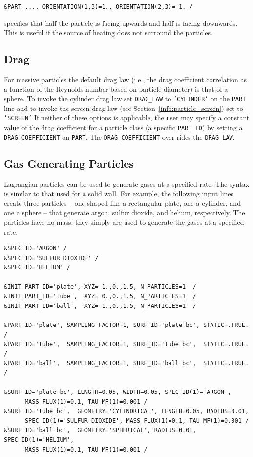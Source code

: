 \documentclass[11pt]{book}
\newcommand{\ct}{\tt\small}
\begin{document}
\footnotesize
\begin{verbatim}
&PART ..., ORIENTATION(1,3)=1., ORIENTATION(2,3)=-1. /
\end{verbatim}
\normalsize

\noindent
specifies that half the particle is facing upwards and half is facing downwards. This is useful if the source of heating does not surround the particles.


\subsection{Drag}
\label{info:particle_drag}

For massive particles the default drag law (i.e., the drag coefficient correlation as a function of the Reynolds number based on particle diameter) is that of a sphere.
To invoke the cylinder drag law set {\ct DRAG\_LAW} to {\ct 'CYLINDER'} on the {\ct PART} line and to invoke the screen drag law (see Section~\ref{info:particle_screen}) set to {\ct 'SCREEN'}  If neither of these options is applicable,
the user may specify a constant value of the drag coefficient for a particle class (a specific {\ct PART\_ID}) by setting a {\ct DRAG\_COEFFICIENT} on {\ct PART}.
The {\ct DRAG\_COEFFICIENT} over-rides the {\ct DRAG\_LAW}.


\subsection{Gas Generating Particles}
\label{info:particle_mass_generation}

Lagrangian particles can be used to generate gases at a specified rate. The syntax is similar to that used for a solid wall. For example, the following input lines create three particles -- one shaped like a rectangular plate, one a cylinder, and one a sphere -- that generate argon, sulfur dioxide, and helium, respectively. The particles have no mass; they simply are used to generate the gases at a specified rate.

\footnotesize
\begin{verbatim}
&SPEC ID='ARGON' /
&SPEC ID='SULFUR DIOXIDE' /
&SPEC ID='HELIUM' /

&INIT PART_ID='plate', XYZ=-1.,0.,1.5, N_PARTICLES=1  /
&INIT PART_ID='tube',  XYZ= 0.,0.,1.5, N_PARTICLES=1  /
&INIT PART_ID='ball',  XYZ= 1.,0.,1.5, N_PARTICLES=1  /

&PART ID='plate', SAMPLING_FACTOR=1, SURF_ID='plate bc', STATIC=.TRUE. /
&PART ID='tube',  SAMPLING_FACTOR=1, SURF_ID='tube bc',  STATIC=.TRUE. /
&PART ID='ball',  SAMPLING_FACTOR=1, SURF_ID='ball bc',  STATIC=.TRUE. /

&SURF ID='plate bc', LENGTH=0.05, WIDTH=0.05, SPEC_ID(1)='ARGON',
      MASS_FLUX(1)=0.1, TAU_MF(1)=0.001 /
&SURF ID='tube bc',  GEOMETRY='CYLINDRICAL', LENGTH=0.05, RADIUS=0.01,
      SPEC_ID(1)='SULFUR DIOXIDE', MASS_FLUX(1)=0.1, TAU_MF(1)=0.001 /
&SURF ID='ball bc',  GEOMETRY='SPHERICAL', RADIUS=0.01, SPEC_ID(1)='HELIUM',
      MASS_FLUX(1)=0.1, TAU_MF(1)=0.001 /
\end{verbatim}
\normalsize
\end{document}
